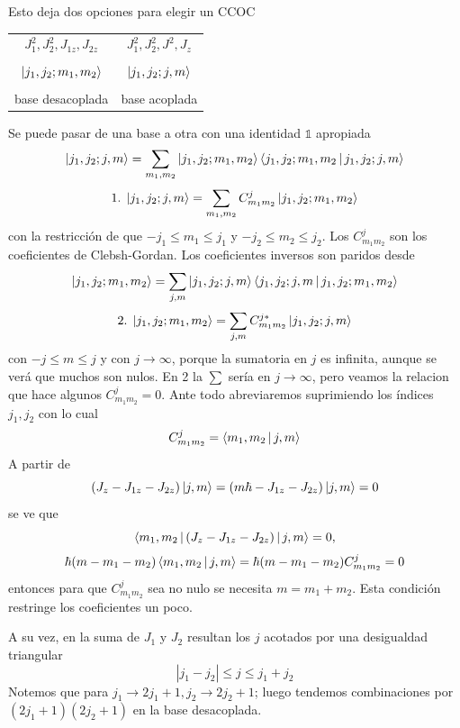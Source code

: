 \documentclass[10pt,oneside]{CBFT_book}
\begin{document}
Esto deja dos opciones para elegir un CCOC

\begin{center}
\begin{tabular}{|c|c|}
\hline 
$J_1^2, J_2^2, J_{1z}, J_{2z}$ & $J_1^2, J_2^2, J^2, J_{z}$ \\
& \\
$\Ket{j_1,j_2;m_1,m_2}$ & $\Ket{j_1,j_2;j,m}$ \\
& \\
base desacoplada & base acoplada \\
\hline
\end{tabular}
\end{center}

Se puede pasar de una base a otra con una identidad $\mathbb{1}$ apropiada
\[
	\Ket{j_1,j_2;j,m} = \sum_{m_1,m_2} \Ket{j_1,j_2;m_1,m_2}\Braket{j_1,j_2;m_1,m_2|j_1,j_2;j,m}
\]
\[
	1. \; \Ket{j_1,j_2;j,m} = \sum_{m_1,m_2} C_{m_1m_2}^j \Ket{j_1,j_2;m_1,m_2}
\]
con la restricción de que $-j_1 \leq m_1 \leq j_1$ y $-j_2 \leq m_2 \leq j_2$.
Los $C_{m_1 m_2}^j$ son los coeficientes de Clebsh-Gordan. 
Los coeficientes inversos son paridos desde 
\[
	\Ket{j_1,j_2;m_1,m_2} = \sum_{j,m} \Ket{j_1,j_2;j,m}\Braket{j_1,j_2;j,m|j_1,j_2;m_1,m_2}
\]
\[
	2. \; \Ket{j_1,j_2;m_1,m_2} = \sum_{j,m} C_{m_1m_2}^{j*}\Ket{j_1,j_2;j,m}
\]
con $-j \leq m \leq j$ y con $j\to\infty$, porque la sumatoria en $j$ es infinita, aunque se verá
que muchos son nulos.
En 2 la $\sum$ sería en $j\to\infty$, pero veamos la relacion que hace algunos $C_{m_1 m_2}^j=0$. 
Ante todo abreviaremos suprimiendo los índices $j_1,j_2$ con lo cual 
\[
	C_{m_1m_2}^{j} = \Braket{m_1,m_2|j,m}
\]
A partir de
\[
	(J_{z} - J_{1z} - J_{2z})\Ket{j,m} = (m\hbar - J_{1z} - J_{2z})\Ket{j,m} = 0
\]
se ve que
\[
	\Braket{m_1,m_2|(J_{z} - J_{1z} - J_{2z})|j,m}= 0, 
\]
\[
	\hbar(m-m_1-m_2)\Braket{m_1,m_2|j,m} = \hbar(m-m_1-m_2) C^j_{m_1 m_2} = 0
\]
entonces para que $C^j_{m_1 m_2}$ sea no nulo se necesita $m = m_1 + m_2$.
Esta condición restringe los coeficientes un poco.

A su vez, en la suma de $J_1$ y $J_2$ resultan los $j$ acotados por una desigualdad triangular 
\[
	|j_1 - j_2| \leq j \leq j_1 + j_2
\]
Notemos que para $j_1 \to 2 j_1 + 1, j_2 \to 2j_2 + 1$; luego tendemos combinaciones por 
$(2 j_1 + 1)(2 j_2 + 1)$ en la base desacoplada.
\end{document}
